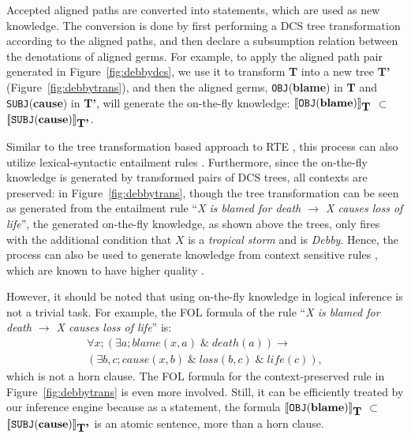 \documentclass[11pt]{article}
\def\den#1{[\![#1]\!]}
\begin{document}
Accepted aligned paths are converted into statements, which are used as 
new knowledge. The conversion is done by first performing a DCS tree transformation 
according to the aligned paths, and then declare a subsumption relation between the 
denotations of aligned germs. 
For example, to apply the aligned path pair generated in Figure~\ref{fig:debbydcs}, we use it 
to transform {\bf T} into a new tree {\bf T'} (Figure~\ref{fig:debbytrans}), and then the aligned germs, \texttt{OBJ}(\textbf{blame}) in {\bf T} and \texttt{SUBJ}(\textbf{cause}) in {\bf T'}, will 
generate the on-the-fly knowledge:
$\den{\mbox{\texttt{OBJ}}(\mbox{\textbf{blame}})}_{\mbox{\textbf{T}}}$ $\subset$ 
$\den{\mbox{\texttt{SUBJ}}(\mbox{\textbf{cause}})}_{\mbox{\textbf{T'}}}$. 

Similar to the tree transformation based approach to RTE \cite{barheim07}, 
this process can also utilize lexical-syntactic entailment rules \cite{szpektor07}. 
Furthermore, since the on-the-fly knowledge is generated by transformed
pairs of DCS trees, all contexts are preserved: in Figure~\ref{fig:debbytrans}, 
though the tree transformation can be seen as generated from the entailment rule 
``\textit{X is blamed for death $\rightarrow$ X causes loss of life}'', the generated 
on-the-fly knowledge, as shown above the trees, only fires with the additional 
condition that $X$ is a \textit{tropical storm} and is \textit{Debby}. Hence, the 
process can also be used to generate 
knowledge from context sensitive rules \cite{melamud13}, which are known to have higher quality 
\cite{pantel07,clark09}. 

However, it should be noted that using on-the-fly knowledge in logical inference is not a 
trivial task. For example, the FOL formula of 
the rule ``\textit{X is blamed for death $\rightarrow$ X causes loss of life}'' is:
\begin{multline*}
\forall x; (\exists a; blame(x,a) \;\&\; death(a))\rightarrow \\
(\exists b,c; cause(x,b) \;\&\; loss(b,c) \;\&\; life(c)), 
\end{multline*}
which is not a horn clause. The FOL formula for the context-preserved rule in 
Figure~\ref{fig:debbytrans} 
is even more involved. Still, it can be efficiently treated by our inference engine because 
as a statement, the formula $\den{\mbox{\texttt{OBJ}}(\mbox{\textbf{blame}})}_{\mbox{\textbf{T}}}$ 
$\subset$ 
$\den{\mbox{\texttt{SUBJ}}(\mbox{\textbf{cause}})}_{\mbox{\textbf{T'}}}$ is an atomic sentence, 
more than a horn clause. 
\end{document}
